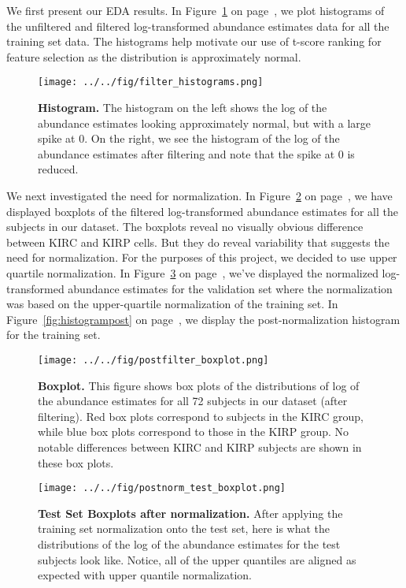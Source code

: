We first present our EDA results.  In Figure~\ref{fig:histogram} on
page~\pageref{fig:histogram}, we plot histograms of the unfiltered
and filtered log-transformed abundance estimates data for all the
training set data.  The histograms help motivate our use of t-score
ranking for feature selection as the distribution is approximately
normal.

\begin{figure}[H]
  \centering
    \texttt{[image: ../../fig/filter\_histograms.png]}
\caption{\textbf{Histogram.} The histogram on the left shows the log of the abundance estimates looking
  approximately normal, but with a large spike at 0.  On the right, we see the
  histogram of the log of the abundance estimates after filtering and note that the spike at 0 is
  reduced.}
   \label{fig:histogram}
\end{figure}

We next investigated the need for normalization.  In Figure~\ref{fig:boxplot}
on page~\pageref{fig:boxplot}, we have displayed boxplots of the filtered
log-transformed abundance estimates for all the subjects in our dataset.  The
boxplots reveal no visually obvious difference between KIRC and KIRP cells.
But they do reveal variability that suggests the need for normalization.
For the purposes of this project, we decided to use upper quartile normalization.
In Figure~\ref{fig:boxplotpost} on page~\pageref{fig:boxplotpost}, we've displayed
the normalized log-transformed abundance estimates for the validation set where
the normalization was based on the upper-quartile normalization of the training
set.  In Figure~\ref{fig:histogrampost} on page~\pageref{fig:histogrampost},
we display the post-normalization histogram for the training set. 

\begin{figure}[H]
  \centering
    \texttt{[image: ../../fig/postfilter\_boxplot.png]}
\caption{\textbf{Boxplot.} This figure shows box plots of the distributions of
  log of the abundance estimates for all 72 subjects in our dataset (after filtering). Red 	box
  plots correspond to subjects in the KIRC group, while blue box plots correspond
  to those in the KIRP group. No notable differences between KIRC and KIRP
  subjects are shown in these box plots.}
   \label{fig:boxplot}
\end{figure}


\begin{figure}[H]
  \centering
    \texttt{[image: ../../fig/postnorm\_test\_boxplot.png]}
\caption{\textbf{Test Set Boxplots after normalization.} After applying the training
  set normalization onto the test set, here is what the distributions of the
  log of the abundance estimates for the test subjects look like. Notice, all of the upper quantiles
  are aligned as expected with upper quantile normalization.}
   \label{fig:boxplotpost}
\end{figure}


